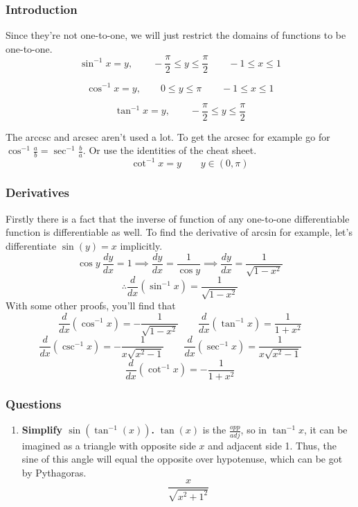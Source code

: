 \documentclass{article}
\begin{document}
	\subsubsection{Introduction}

	Since they're not one-to-one, we will just restrict the domains of functions to be one-to-one.
	\[
		\sin^{-1}x = y, \qquad - \frac{\pi}{2} \leq y \leq \frac{\pi}{2} \qquad -1 \leq x \leq 1
	\]

	\[
		\cos^{-1}x = y, \qquad  0 \leq y \leq \pi  \qquad -1 \leq x \leq 1
	\]

	\[
		\tan^{-1}x = y, \qquad - \frac{\pi}{2} \leq y \leq \frac{\pi}{2}
	\]


	The arccsc and arcsec aren't used a lot. To get the arcsec for example go for $\cos^{-1}\frac{a}{b} = \sec^{-1}{ \frac{b}{a} }$.
	Or use the identities of the cheat sheet.
	\[
		\qquad  \cot^{-1}x = y \qquad y \in (0,\pi) 
	\]

	\newpage

	\subsubsection{Derivatives}
	Firstly there is a fact that the inverse of function of any one-to-one differentiable function is differentiable as well.
	To find the derivative of arcsin for example, let's differentiate $\sin(y)=x$ implicitly. \[
		\cos{y} \ \frac{dy}{dx} = 1 \implies \frac{dy}{dx} = \frac{1}{\cos{y}} \implies \frac{dy}{dx} = \frac{1}{\sqrt{1-x^2}}
	\]
	\[
		\therefore \frac{d}{dx}(\sin^{-1}x) = \frac{1}{\sqrt{1-x^2}}
	\]
	With some other proofs, you'll find that
	\[
		\frac{d}{dx}(\cos^{-1}x) = - \frac{1}{\sqrt{1-x^2}}  \qquad 
		\frac{d}{dx}(\tan^{-1}x) = \frac{1}{1+x^2}	
	\]
	\[
		\frac{d}{dx}(\csc^{-1}x) = - \frac{1}{x \sqrt{x^2-1}}  \qquad 
		\frac{d}{dx}(\sec^{-1}x) =  \frac{1}{x \sqrt{x^2-1}}   \qquad 
	\]
	\[
		\frac{d}{dx}(\cot^{-1}x) = - \frac{1}{1+x^2}
	\]

	\subsubsection{Questions}

	\begin{enumerate}[1.]
		\item \textbf{Simplify $ \sin(\tan^{-1}(x))$.}
			$\tan(x)$ is the $\frac{opp}{adj}$, so in $ \tan^{-1}x$, it can be imagined as a triangle with opposite side $x$ and adjacent side 1. Thus, the sine of this angle will equal the opposite over hypotenuse, which can be got by Pythagoras.
			\[
				\frac{x}{\sqrt{x^2+1^2}}
			\]

	\end{enumerate}
\end{document}
